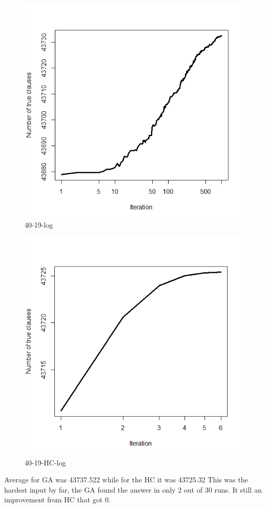 \documentclass{article}
\begin{document}
\begin{figure}[H]
  \includegraphics[width=\linewidth]{40-19-log.png}
  \caption{40-19-log}
\end{figure}
\begin{figure}[H]
  \includegraphics[width=\linewidth]{40-19-HC-log.png}
  \caption{40-19-HC-log}
\end{figure}
Average for GA was 43737.522 while for the HC it was 43725.32
This was the hardest input by far, the GA found the answer in only 2 out of 30 runs. It still an improvement from HC that got 0.
\end{document}
